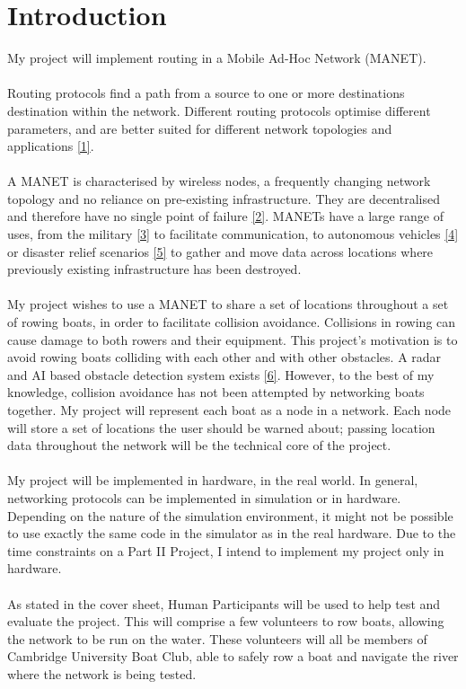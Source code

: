 \documentclass[10pt, a4paper]{article}
\begin{document}
\section*{Introduction}
My project will implement routing in a Mobile Ad-Hoc Network (MANET). \\ \\
Routing protocols find a path from a source to one or more destinations destination within the network. Different routing protocols optimise different parameters, and are better suited for different network topologies and applications \hyperref[routing]{[1]}. \\ \\
A MANET is characterised by wireless nodes, a frequently changing network topology and no reliance on pre-existing infrastructure. They are decentralised and therefore have no single point of failure \hyperref[manet]{[2]}. MANETs have a large range of uses, from the military \hyperref[jtrs]{[3]} to facilitate communication, to autonomous vehicles \hyperref[auto]{[4]} or disaster relief scenarios \hyperref[disaster]{[5]} to gather and move data across locations where previously existing infrastructure has been destroyed. \\ \\
My project wishes to use a MANET to share a set of locations throughout a set of rowing boats, in order to facilitate collision avoidance. Collisions in rowing can cause damage to both rowers and their equipment. This project's motivation is to avoid rowing boats colliding with each other and with other obstacles. A radar and AI based obstacle detection system exists \hyperref[rowcus]{[6]}. However, to the best of my knowledge, collision avoidance has not been attempted by networking boats together. My project will represent each boat as a node in a network. Each node will store a set of locations the user should be warned about; passing location data throughout the network will be the technical core of the project. \\ \\
My project will be implemented in hardware, in the real world. In general, networking protocols can be implemented in simulation or in hardware. Depending on the nature of the simulation environment, it might not be possible to use exactly the same code in the simulator as in the real hardware. Due to the time constraints on a Part II Project, I intend to implement my project only in hardware. \\ \\
As stated in the cover sheet, Human Participants will be used to help test and evaluate the project. This will comprise a few volunteers to row boats, allowing the network to be run on the water. These volunteers will all be members of Cambridge University Boat Club, able to safely row a boat and navigate the river where the network is being tested.
\end{document}
